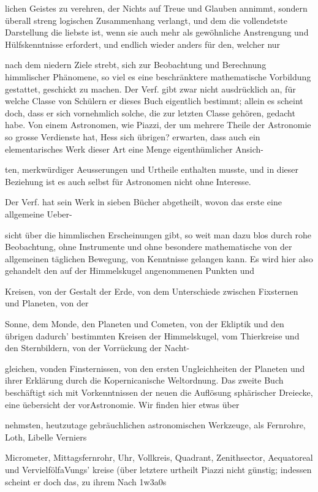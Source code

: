 \documentclass[10pt,a4paper]{article}
\begin{document}
lichen Geistes zu verehren, der Nichts auf Treue und Glauben annimmt, sondern überall streng logischen Zusammenhang verlangt, und dem die vollendetste Darstellung die liebste ist, wenn sie auch mehr als gewöhnliche Anstrengung und Hülfskenntnisse erfordert, und endlich wieder anders für den, welcher nur

nach dem niedern Ziele strebt, sich zur Beobachtung und Berechnung himmlischer Phänomene, so viel es eine beschränktere mathematische Vorbildung gestattet, geschickt zu machen. Der Verf. gibt zwar nicht ausdrücklich an, für welche Classe von Schülern er dieses Buch eigentlich bestimmt; allein es scheint doch, dass er sich vornehmlich solche, die zur letzten Classe gehören, gedacht habe. Von einem Astronomen, wie Piazzi, der um mehrere Theile der Astronomie so grosse Verdienste hat, Hess sich übrigen? erwarten, dass auch ein elementarisches Werk dieser Art eine Menge eigenthümlicher Ansich-

ten, merkwürdiger Aeusserungen und Urtheile enthalten musste, und in dieser Beziehung ist es auch selbst für Astronomen nicht ohne Interesse.

Der Verf. hat sein Werk in sieben Bücher abgetheilt, wovon das erste eine allgemeine Ueber-

sicht über die himmlischen Erscheinungen gibt, so weit man dazu blos durch rohe Beobachtung, ohne Instrumente und ohne besondere mathematische von der allgemeinen täglichen Bewegung, von Kenntnisse gelangen kann. Es wird hier also gehandelt den auf der Himmelskugel angenommenen Punkten und

Kreisen, von der Gestalt der Erde, von dem Unterschiede zwischen Fixsternen und Planeten, von der

Sonne, dem Monde, den Planeten und Cometen, von der Ekliptik und den übrigen dadurch' bestimmten Kreisen der Himmelskugel, vom Thierkreise und den Sternbildern, von der Vorrückung der Nacht-

gleichen, vonden Finsternissen, von den ersten Ungleichheiten der Planeten und ihrer Erklärung durch die Kopernicanische Weltordnung. Das zweite Buch beschäftigt sich mit Vorkenntnissen der neuen die Auflösung sphärischer Dreiecke, eine üebersicht der vorAstronomie. Wir finden hier etwas über

nehmsten, heutzutage gebräuchlichen astronomischen Werkzeuge, als Fernrohre, Loth, Libelle Verniers

Micrometer, Mittagsfernrohr, Uhr, Vollkreis, Quadrant, Zenithsector, Aequatoreal und VervielfölfaVungs' kreise (über letztere urtheilt Piazzi nicht günstig; indessen scheint er doch das, zu ihrem Nach 1w3a0s
\end{document}
